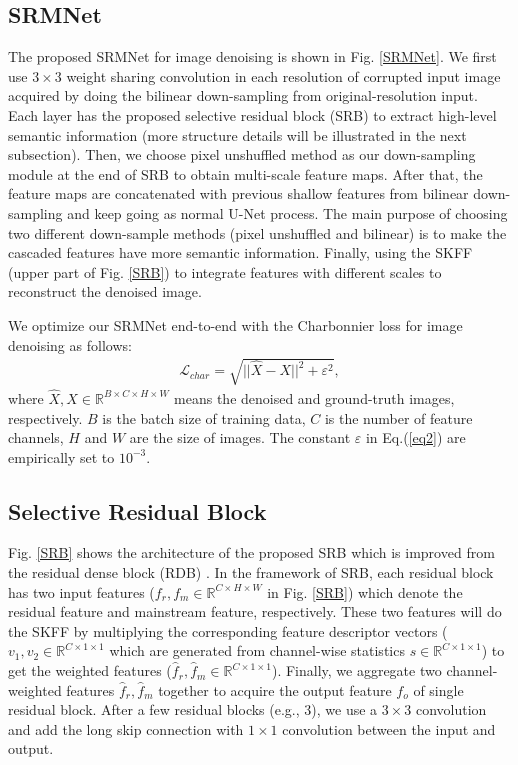 \documentclass{article}
\begin{document}
\subsection{SRMNet}
The proposed SRMNet for image denoising is shown in Fig. \ref{SRMNet}. We first use $3 \times 3$ weight sharing convolution in each resolution of corrupted input image acquired by doing the bilinear down-sampling from original-resolution input. Each layer has the proposed selective residual block (SRB) to extract high-level semantic information (more structure details will be illustrated in the next subsection). Then, we choose pixel unshuffled method as our down-sampling module at the end of SRB to obtain multi-scale feature maps. After that, the feature maps are concatenated with previous shallow features from bilinear down-sampling and keep going as normal U-Net process. The main purpose of choosing two different down-sample methods (pixel unshuffled and bilinear) is to make the cascaded features have more semantic information. Finally, using the SKFF (upper part of Fig. \ref{SRB}) to integrate features with different scales to reconstruct the denoised image. 

We optimize our SRMNet end-to-end with the Charbonnier loss \cite{33} for image denoising as follows:
\newcommand{\Lagr}{\mathcal{L}} 
\begin{equation}
\begin{aligned}
\Lagr_{char} = \sqrt{ ||\hat{X} - X||^2 + \varepsilon^2}, \label{eq2}
\end{aligned}
\end{equation}
where $\hat{X}, X\in\mathbb{R}^{B \times C \times H \times W}$ means the denoised and ground-truth images, respectively. $B$ is the batch size of training data, $C$ is the number of feature channels, $H$ and $W$ are the size of images. The constant $\varepsilon$ in Eq.(\ref{eq2}) are empirically set to $10^{-3}$.

\subsection{Selective Residual Block}
Fig. \ref{SRB} shows the architecture of the proposed SRB which is improved from the residual dense block (RDB) \cite{07}. In the framework of SRB, each residual block has two input features ($f_r, f_m \in \mathbb{R}^{C \times H \times W}$ in Fig. \ref{SRB}) which denote the residual feature and mainstream feature, respectively. These two features will do the SKFF by multiplying the corresponding feature descriptor vectors ($v_1, v_2 \in \mathbb{R}^{C \times 1 \times 1}$ which are generated from channel-wise statistics $s \in \mathbb{R}^{C \times 1 \times 1}$) to get the weighted features ($\hat{f}_r, \hat{f}_m \in \mathbb{R}^{C \times 1 \times 1}$). Finally, we aggregate two channel-weighted features $\hat{f}_r, \hat{f}_m$ together to acquire the output feature $f_o$ of single residual block. After a few residual blocks (e.g., 3), we use a $3 \times 3$ convolution and add the long skip connection with $1 \times 1$ convolution between the input and output.
\end{document}
